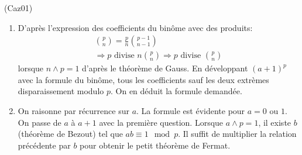 \begin{tiny}(Caz01)\end{tiny}
\begin{enumerate}
 \item D'après l'expression des coefficients du binôme avec des produits:
 \begin{multline*}
  \binom{p}{n} = \frac{p}{n} \binom{p-1}{n-1}\\
  \Rightarrow
  p \text{ divise } n \binom{p}{n}
  \Rightarrow
  p \text{ divise } \binom{p}{n}
 \end{multline*}
lorsque $n\wedge p = 1$ d'après le théorème de Gauss.\newline
En développant $(a+1)^p$ avec la formule du binôme, tous les coefficients sauf les deux extrèmes disparaissement modulo $p$. On en déduit la formule demandée.
 \item On raisonne par  récurrence sur $a$. La formule est évidente pour $a= 0$ ou $1$. On passe de $a$ à $a+1$ avec la première question.\newline
 Lorsque $a\wedge p = 1$, il existe $b$ (théorème de Bezout) tel que $ab \equiv 1 \mod p$. Il suffit de multiplier la relation précédente par $b$ pour obtenir le petit théorème de Fermat. 
\end{enumerate}
